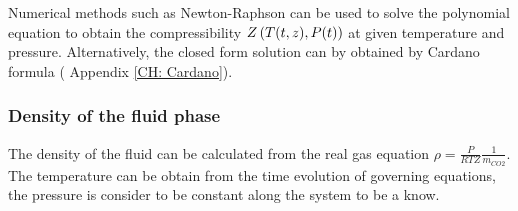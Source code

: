 \documentclass[../Article_Model_Parameters.tex]{subfiles}
\begin{document}
	Numerical methods such as Newton-Raphson can be used to solve the polynomial equation to obtain the compressibility ${\color{black}Z}\left({\color{black}T}(t,z), {\color{black}P}(t)\right)$ at given temperature and pressure. Alternatively, the closed form solution can by obtained by Cardano formula ( Appendix \ref{CH: Cardano}).
	
	\subsubsection{Density of the fluid phase} \label{subsubsec: Fluid density}
	
	The density of the fluid can be calculated from the real gas equation $\rho = \frac{P}{RTZ} \frac{1}{m_{CO2}}$. The temperature can be obtain from the time evolution of governing equations, the pressure is consider to be constant along the system to be a know. 
	
\end{document}
